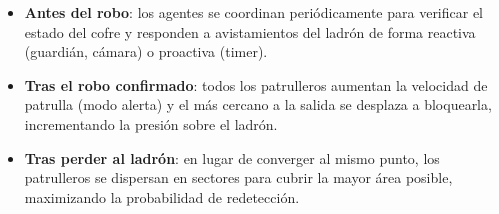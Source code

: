 \documentclass[a4paper,12pt]{article}
\begin{document}
\begin{itemize}
    \item \textbf{Antes del robo}: los agentes se coordinan periódicamente para verificar el estado del cofre y responden a avistamientos del ladrón de forma reactiva (guardián, cámara) o proactiva (timer).
    \item \textbf{Tras el robo confirmado}: todos los patrulleros aumentan la velocidad de patrulla (modo alerta) y el más cercano a la salida se desplaza a bloquearla, incrementando la presión sobre el ladrón.
    \item \textbf{Tras perder al ladrón}: en lugar de converger al mismo punto, los patrulleros se dispersan en sectores para cubrir la mayor área posible, maximizando la probabilidad de redetección.
\end{itemize}
\end{document}

